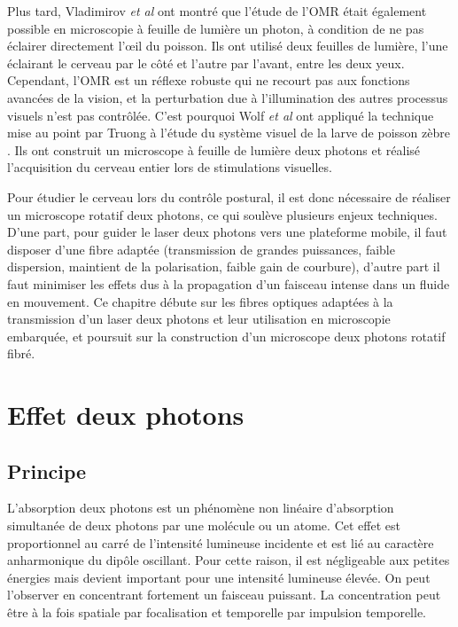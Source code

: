 Plus tard, Vladimirov \emph{et al} \cite{vladimirov_light-sheet_2014} ont montré que l'étude de l'OMR était également possible en microscopie à feuille de lumière un photon, à condition de ne pas éclairer directement l'œil du poisson. Ils ont utilisé deux feuilles de lumière, l'une éclairant le cerveau par le côté et l'autre par l'avant, entre les deux yeux. Cependant, l'OMR est un réflexe robuste qui ne recourt pas aux fonctions avancées de la vision, et la perturbation due à l'illumination des autres processus visuels n'est pas contrôlée. C'est pourquoi Wolf \emph{et al} ont appliqué la technique mise au point par Truong à l'étude du système visuel de la larve de poisson zèbre \cite{wolf_whole-brain_2015}. Ils ont construit un microscope à feuille de lumière deux photons et réalisé l'acquisition du cerveau entier lors de stimulations visuelles.


Pour étudier le cerveau lors du contrôle postural, il est donc nécessaire de réaliser un microscope rotatif deux photons, ce qui soulève plusieurs enjeux techniques. D'une part, pour guider le laser deux photons vers une plateforme mobile, il faut disposer d'une fibre adaptée (transmission de grandes puissances, faible dispersion, maintient de la polarisation, faible gain de courbure), d'autre part il faut minimiser les effets dus à la propagation d'un faisceau intense dans un fluide en mouvement. Ce chapitre débute sur les fibres optiques adaptées à la transmission d'un laser deux photons et leur utilisation en microscopie embarquée, et poursuit sur la construction d'un microscope deux photons rotatif fibré.



\section{Effet deux photons}

\subsection{Principe}

L'absorption deux photons est un phénomène non linéaire d'absorption simultanée de deux photons par une molécule ou un atome. Cet effet est proportionnel au carré de l'intensité lumineuse incidente et est lié au caractère anharmonique du dipôle oscillant. Pour cette raison, il est négligeable aux petites énergies mais devient important pour une intensité lumineuse élevée. On peut l'observer en concentrant fortement un faisceau puissant. La concentration peut être à la fois spatiale par focalisation et temporelle par impulsion temporelle.

